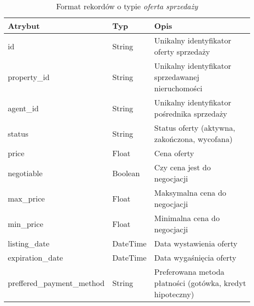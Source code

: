 \begin{table}[H]
    \caption{Format rekordów o typie \textit{oferta sprzedaży}}
    \centering
    \begin{tabular}{|l|l|l|}
    \hline
    \textbf{Atrybut} & \textbf{Typ} & \textbf{Opis} \\
    \hline
    id & String & Unikalny identyfikator oferty sprzedaży \\
    property\_id & String & Unikalny identyfikator sprzedawanej nieruchomości \\
    agent\_id & String & Unikalny identyfikator pośrednika sprzedaży \\
    status & String & Status oferty (aktywna, zakończona, wycofana) \\
    price & Float & Cena oferty \\
    negotiable & Boolean & Czy cena jest do negocjacji \\    
    max\_price & Float & Maksymalna cena do negocjacji \\
    min\_price & Float & Minimalna cena do negocjacji \\
    listing\_date & DateTime & Data wystawienia oferty \\
    expiration\_date & DateTime & Data wygaśnięcia oferty \\
    preffered\_payment\_method & String & Preferowana metoda płatności (gotówka, kredyt hipoteczny) \\
    \hline
    \end{tabular}
    \label{tab:sell_offer_details}
\end{table}


